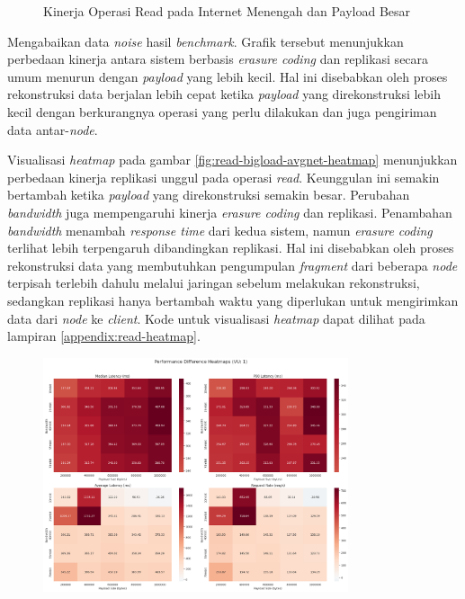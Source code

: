 \begin{enumerate}
\begin{figure}[ht]
    \caption{Kinerja Operasi Read pada Internet Menengah dan Payload Besar}
      \label{fig:read-bigload-avgnet}
  \end{figure}

  Mengabaikan data \textit{noise} hasil \textit{benchmark}. Grafik tersebut menunjukkan perbedaan kinerja antara sistem berbasis \textit{erasure coding} dan replikasi secara umum menurun dengan \textit{payload} yang lebih kecil. Hal ini disebabkan oleh proses rekonstruksi data berjalan lebih cepat ketika \textit{payload} yang direkonstruksi lebih kecil dengan berkurangnya operasi yang perlu dilakukan dan juga pengiriman data antar-\textit{node}.

  Visualisasi \textit{heatmap} pada gambar \ref{fig:read-bigload-avgnet-heatmap} menunjukkan perbedaan kinerja replikasi unggul pada operasi \textit{read}. Keunggulan ini semakin bertambah ketika \textit{payload} yang direkonstruksi semakin besar. Perubahan \textit{bandwidth} juga mempengaruhi kinerja \textit{erasure coding} dan replikasi. Penambahan \textit{bandwidth} menambah \textit{response time} dari kedua sistem, namun \textit{erasure coding} terlihat lebih terpengaruh dibandingkan replikasi. Hal ini disebabkan oleh proses rekonstruksi data yang membutuhkan pengumpulan \textit{fragment} dari beberapa \textit{node} terpisah terlebih dahulu melalui jaringan sebelum melakukan rekonstruksi, sedangkan replikasi hanya bertambah waktu yang diperlukan untuk mengirimkan data dari \textit{node} ke \textit{client}. Kode untuk visualisasi \textit{heatmap} dapat dilihat pada lampiran \ref{appendix:read-heatmap}.

  \begin{figure}[ht]
    \centering
    \includegraphics[width=0.8\textwidth]{resources/chapter-4/read_bigload_avgnet_heatmap.png}


\end{figure}
\end{enumerate}
